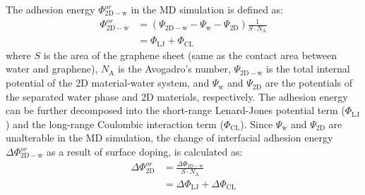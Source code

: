 \documentclass[aps,prl,reprint,groupedaddress,amsmath,amssymb, showpacs]{revtex4-1}
\begin{document}
The adhesion energy \(\Phi_{\mathrm{2D-w}}^{or}\) in the MD simulation is
defined as:
\begin{equation}
\label{eqn:Delta-Phi-or-definition}
\begin{aligned}
\Phi_{\mathrm{2D-w}}^{or} &= (\Psi_{\mathrm{2D-w}} - \Psi_{\mathrm{w}} - \Psi_{\mathrm{2D}})\frac{1}{S \cdot N_{\mathrm{A}}} \\
                     &= \Phi_{\mathrm{LJ}} + \Phi_{\mathrm{CL}}
\end{aligned}
\end{equation}
where \(S\) is the area of the graphene sheet (same as the contact area
 between water and graphene), \(N_{\mathrm{A}}\) is the Avogadro's
 number, \(\Psi_{\mathrm{2D-w}}\) is the total internal potential of the
 2D material-water system, and \(\Psi_{\mathrm{w}}\) and
 \(\Psi_{\mathrm{2D}}\) are the potentials of the separated water phase
 and 2D materials, respectively.  The adhesion energy can be further
 decomposed into the short-range Lenard-Jones potential term
 (\(\Phi_{\mathrm{LJ}}\)) and the long-range Coulombic interaction term
 (\(\Phi_{\mathrm{CL}}\)). Since \(\Psi_{\mathrm{w}}\) and
 \(\Psi_{\mathrm{2D}}\) are unalterable in the MD simulation, the change
 of interfacial adhesion energy \(\Delta \Phi_{\mathrm{2D-w}}^{or}\) as a
 result of surface doping, is calculated as:
\begin{equation}
\label{eqn:delta-Phi-2D-or}
\begin{aligned}
\Delta \Phi_{\mathrm{2D}}^{or} &= \frac{\Delta \Phi_{\mathrm{2D-w}}}{S \cdot N_{\mathrm{A}}} \\
                               &= \Delta \Phi_{\mathrm{LJ}} + \Delta \Phi_{\mathrm{CL}}
\end{aligned}
\end{equation}
\end{document}
